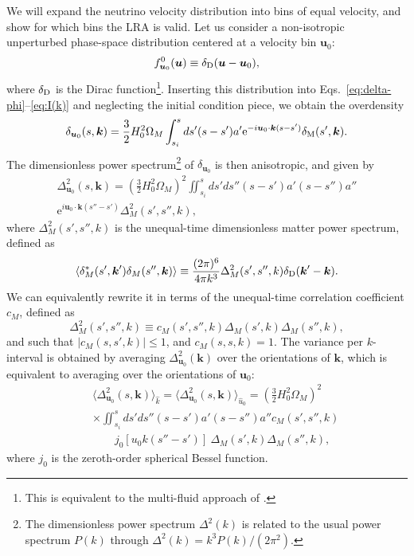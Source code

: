 \documentclass[useAMS, usenatbib]{mnras}
\newcommand{\beq}{\begin{equation}}
\newcommand{\eeq}{\end{equation}}
\newcommand{\barr}{\begin{eqnarray}}
\newcommand{\earr}{\end{eqnarray}}
\newcommand{\rme}{\textrm{e}}
\newcommand{\bs}{\boldsymbol}
\begin{document}
We will expand the neutrino velocity distribution into bins of equal velocity, and show for which bins the LRA is valid. Let us consider a non-isotropic unperturbed phase-space distribution centered at a velocity bin $\bs{u}_0$:
\beq
f^0_{\bs{u}_0}(\bs{u}) \equiv \delta_{\rm D}(\bs{u}- \bs{u}_0),
\eeq
where $\delta_{\rm D}$ is the Dirac function\footnote{This is equivalent to the multi-fluid approach of \cite{Dupuy_14}.}. Inserting this distribution into Eqs.~\eqref{eq:delta-phi}--\eqref{eq:I(k)} and neglecting the initial condition piece, we obtain the overdensity
\barr
\delta_{\bs{u}_0}(s, \bs{k}) = \frac32 H_0^2 \Omega_M \int_{s_i}^s ds' (s - s') a' \rme^{- i \bs{u}_0 \cdot \bs{k} (s - s')} \delta_{\rm M}(s', \bs{k}).
\earr
The dimensionless power spectrum\footnote{The dimensionless power spectrum $\Delta^2(k)$ is related to the usual power spectrum $P(k)$ through $\Delta^2(k) = k^3 P(k)/(2 \pi^2)$.} of $\delta_{\bs{u}_0}$ is then anisotropic, and given by
\barr
\Delta^2_{\bs{u}_0}(s, \bs{k}) =\left(\frac32 H_0^2 \Omega_M\right)^2 \iint_{s_i}^s ds' ds'' (s - s') a' (s - s'') a'' \nonumber\\
\rme^{i \bs{u}_0 \cdot \bs{k} (s'' - s')} \Delta^2_M(s', s'', k), \label{eq:P_u0}
\earr
where $\Delta^2_M(s', s'', k)$ is the unequal-time dimensionless matter power spectrum, defined as
\barr
\langle \delta_M^*(s',\bs{k}')\delta_M(s'',\bs{k})\rangle \equiv \frac{(2 \pi)^6}{4 \pi k^3} \Delta^2_M(s', s'', k) \delta_{\rm D}(\bs{k}' - \bs{k}).
\earr
We can equivalently rewrite it in terms of the unequal-time correlation coefficient $c_M$, defined as
\beq
\Delta^2_M(s', s'', k) \equiv c_M(s', s'', k) \Delta_M(s', k) \Delta_M(s'', k),
\eeq
and such that $|c_M(s, s', k)| \leq 1$, and $c_M(s, s, k) = 1$. The variance per $k$-interval is obtained by averaging $\Delta^2_{\bs{u}_0}(\bs{k})$ over the orientations of $\bs{k}$, which is equivalent to averaging over the orientations of $\bs{u}_0$:
\barr
&&\langle \Delta^2_{\bs{u}_0}(s, \bs{k})\rangle_{\hat{k}} = \langle \Delta^2_{\bs{u}_0}(s, \bs{k})\rangle_{\hat{u}_0} = \left(\frac32 H_0^2 \Omega_M\right)^2  \nonumber\\
&&\times \iint_{s_i}^s ds' ds'' (s - s') a' (s - s'') a'' c_M(s', s'', k) \nonumber\\
&&~~~~~~~~~ j_0[u_0 k (s'' - s')]~  \Delta_M (s', k) \Delta_M(s'', k), \label{eq:P_u0-av}
\earr
where $j_0$ is the zeroth-order spherical Bessel function.
\end{document}

